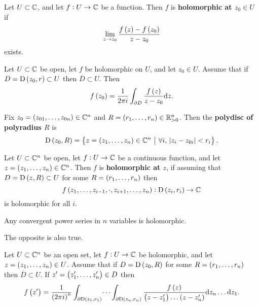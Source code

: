 \begin{definition}
Let $ U \subset \mathbb{C} $, and let $ f : U \to \mathbb{C} $ be a function. Then $ f $ is \textbf{holomorphic at $ z_0 \in U $} if
$$ \lim_{z \to z_0} \dfrac{f\br{z} - f\br{z_0}}{z - z_0} $$
exists.
\end{definition}

\begin{theorem}[Cauchy]
\label{thm:2.3}
Let $ U \subset \mathbb{C} $ be open, let $ f $ be holomorphic on $ U $, and let $ z_0 \in U $. Assume that if $ D = \D\br{z_0, r} \subset U $ then $ \overline{D} \subset U $. Then
$$ f\br{z_0} = \dfrac{1}{2\pi i}\int_{\partial D} \dfrac{f\br{z}}{z - z_0}\d z. $$
\end{theorem}

\begin{notation}
Fix $ z_0 = \br{z_{01}, \dots, z_{0n}} \in \CC^n $ and $ R = \br{r_1, \dots, r_n} \in \RR_{> 0}^n $. Then the \textbf{polydisc of polyradius $ R $} is
$$ \D\br{z_0, R} = \cbr{z = \br{z_1, \dots, z_n} \in \CC^n \st \forall i, \ \abs{z_i - z_{0i}} < r_i}. $$
\end{notation}

\begin{definition}
Let $ U \subset \mathbb{C}^n $ be open, let $ f : U \to \mathbb{C} $ be a continuous function, and let $ z = \br{z_1, \dots, z_n} \in \CC^n $. Then $ f $ is \textbf{holomorphic at $ z $}, if assuming that $ D = \D\br{z, R} \subset U $ for some $ R = \br{r_1, \dots, r_n} $ then
$$ f\br{z_1, \dots, z_{i - 1}, \cdot, z_{i + 1}, \dots, z_n} : \D\br{z_i, r_i} \to \CC $$
is holomorphic for all $ i $.
\end{definition}

\begin{example}
Any convergent power series in $ n $ variables is holomorphic.
\end{example}

The opposite is also true.

\begin{theorem}[Cauchy]
\label{thm:2.7}
Let $ U \subset \mathbb{C}^n $ be an open set, let $ f : U \to \mathbb{C} $ be holomorphic, and let $ z = \br{z_1, \dots, z_n} \in U $. Assume that if $ D = \D\br{z_0, R} $ for some $ R = \br{r_1, \dots, r_n} $ then $ \overline{D} \subset U $. If $ z' = \br{z_1', \dots, z_n'} \in D $ then
$$ f\br{z'} = \dfrac{1}{\br{2\pi i}^n}\int_{\partial\D\br{z_1, r_1}} \dots \int_{\partial\D\br{z_n, r_n}} \dfrac{f\br{z}}{\br{z - z_1'} \dots \br{z - z_n'}}\d z_n \dots \d z_1. $$
\end{theorem}

